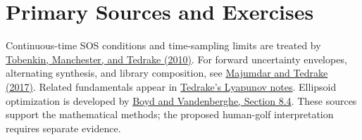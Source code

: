 \documentclass[12pt, openany]{book}
\theoremstyle{plain}
\begin{document}
\section{Primary Sources and Exercises}

Continuous-time SOS conditions and time-sampling limits are treated by \href{https://arxiv.org/abs/1010.3013}{Tobenkin, Manchester, and Tedrake (2010)}. For forward uncertainty envelopes, alternating synthesis, and library composition, see \href{https://groups.csail.mit.edu/robotics-center/public_papers/Majumdar16.pdf}{Majumdar and Tedrake (2017)}. Related fundamentals appear in \href{https://underactuated.mit.edu/lyapunov.html}{Tedrake's Lyapunov notes}. Ellipsoid optimization is developed by \href{https://web.stanford.edu/~boyd/cvxbook/bv_cvxbook.pdf}{Boyd and Vandenberghe, Section 8.4}. These sources support the mathematical methods; the proposed human-golf interpretation requires separate evidence.
\end{document}

